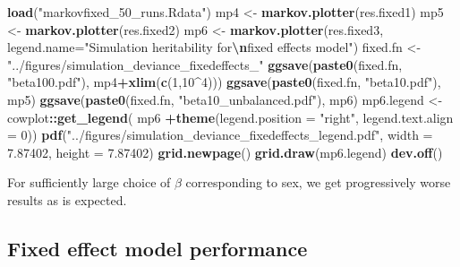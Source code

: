 \documentclass[
]{article}
\newenvironment{Shaded}{\begin{snugshade}}{\end{snugshade}}
\newcommand{\AttributeTok}[1]{\textcolor[rgb]{0.13,0.29,0.53}{#1}}
\newcommand{\DecValTok}[1]{\textcolor[rgb]{0.00,0.00,0.81}{#1}}
\newcommand{\FloatTok}[1]{\textcolor[rgb]{0.00,0.00,0.81}{#1}}
\newcommand{\FunctionTok}[1]{\textcolor[rgb]{0.13,0.29,0.53}{\textbf{#1}}}
\newcommand{\NormalTok}[1]{#1}
\newcommand{\OtherTok}[1]{\textcolor[rgb]{0.56,0.35,0.01}{#1}}
\newcommand{\SpecialCharTok}[1]{\textcolor[rgb]{0.81,0.36,0.00}{\textbf{#1}}}
\newcommand{\StringTok}[1]{\textcolor[rgb]{0.31,0.60,0.02}{#1}}
\begin{document}
\begin{Shaded}
\begin{Highlighting}[]
\FunctionTok{load}\NormalTok{(}\StringTok{"markovfixed\_50\_runs.Rdata"}\NormalTok{)}
\NormalTok{mp4 }\OtherTok{\textless{}{-}} \FunctionTok{markov.plotter}\NormalTok{(res.fixed1)}
\NormalTok{mp5 }\OtherTok{\textless{}{-}} \FunctionTok{markov.plotter}\NormalTok{(res.fixed2)}
\NormalTok{mp6 }\OtherTok{\textless{}{-}} \FunctionTok{markov.plotter}\NormalTok{(res.fixed3,}
  \AttributeTok{legend.name=}\StringTok{"Simulation heritability for}\SpecialCharTok{\textbackslash{}n}\StringTok{fixed effects model"}\NormalTok{)}
\NormalTok{fixed.fn }\OtherTok{\textless{}{-}} \StringTok{"../figures/simulation\_deviance\_fixedeffects\_"}
\FunctionTok{ggsave}\NormalTok{(}\FunctionTok{paste0}\NormalTok{(fixed.fn, }\StringTok{"beta100.pdf"}\NormalTok{),}
\NormalTok{       mp4}\SpecialCharTok{+}\FunctionTok{xlim}\NormalTok{(}\FunctionTok{c}\NormalTok{(}\DecValTok{1}\NormalTok{,}\DecValTok{10}\SpecialCharTok{\^{}}\DecValTok{4}\NormalTok{)))}
\FunctionTok{ggsave}\NormalTok{(}\FunctionTok{paste0}\NormalTok{(fixed.fn, }\StringTok{"beta10.pdf"}\NormalTok{), mp5)}
\FunctionTok{ggsave}\NormalTok{(}\FunctionTok{paste0}\NormalTok{(fixed.fn, }\StringTok{"beta10\_unbalanced.pdf"}\NormalTok{), mp6)}
\NormalTok{mp6.legend }\OtherTok{\textless{}{-}}\NormalTok{ cowplot}\SpecialCharTok{::}\FunctionTok{get\_legend}\NormalTok{(}
\NormalTok{  mp6 }\SpecialCharTok{+}\FunctionTok{theme}\NormalTok{(}\AttributeTok{legend.position =} \StringTok{"right"}\NormalTok{, }\AttributeTok{legend.text.align =} \DecValTok{0}\NormalTok{))}
\FunctionTok{pdf}\NormalTok{(}\StringTok{"../figures/simulation\_deviance\_fixedeffects\_legend.pdf"}\NormalTok{,}
    \AttributeTok{width =} \FloatTok{7.87402}\NormalTok{, }\AttributeTok{height =} \FloatTok{7.87402}\NormalTok{)}
\FunctionTok{grid.newpage}\NormalTok{()}
\FunctionTok{grid.draw}\NormalTok{(mp6.legend)}
\FunctionTok{dev.off}\NormalTok{()}
\end{Highlighting}
\end{Shaded}

For sufficiently large choice of \(\beta\) corresponding to sex, we get
progressively worse results as is expected.

\hypertarget{fixed-effect-model-performance}{%
\subsection*{Fixed effect model
performance}\label{fixed-effect-model-performance}}
\end{document}
